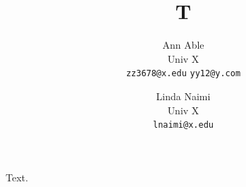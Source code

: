 \documentclass{article}
\begin{document}
\title{T}
\author{Ann Able\\ Univ X\\ \texttt{zz3678@x.edu} \quad \texttt{yy12@y.com} \and Linda Naimi\\ Univ X\\ \texttt{lnaimi@x.edu}}
\maketitle
Text.
\end{document}

